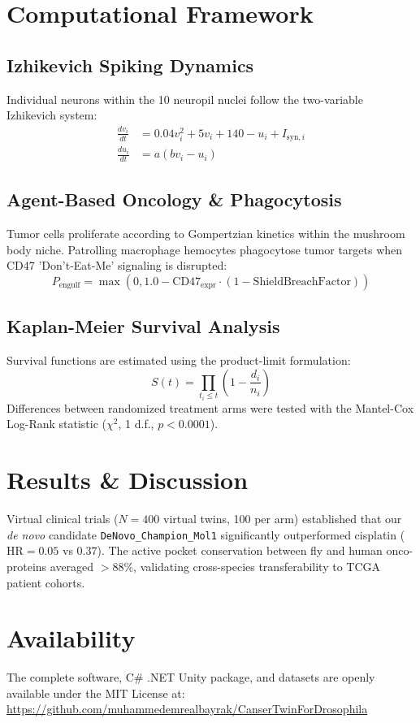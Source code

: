 \documentclass[11pt,a4paper]{article}
\begin{document}
\section{Computational Framework}
\subsection{Izhikevich Spiking Dynamics}
Individual neurons within the 10 neuropil nuclei follow the two-variable Izhikevich system:
\begin{align}
\frac{dv_i}{dt} &= 0.04 v_i^2 + 5 v_i + 140 - u_i + I_{\text{syn}, i} \\
\frac{du_i}{dt} &= a(b v_i - u_i)
\end{align}

\subsection{Agent-Based Oncology \& Phagocytosis}
Tumor cells proliferate according to Gompertzian kinetics within the mushroom body niche. Patrolling macrophage hemocytes phagocytose tumor targets when CD47 'Don't-Eat-Me' signaling is disrupted:
\begin{equation}
P_{\text{engulf}} = \max\left(0, 1.0 - \text{CD47}_{\text{expr}} \cdot (1 - \text{ShieldBreachFactor})\right)
\end{equation}

\subsection{Kaplan-Meier Survival Analysis}
Survival functions are estimated using the product-limit formulation:
\begin{equation}
S(t) = \prod_{t_i \le t} \left(1 - \frac{d_i}{n_i}\right)
\end{equation}
Differences between randomized treatment arms were tested with the Mantel-Cox Log-Rank statistic ($\chi^2$, 1 d.f., $p < 0.0001$).

\section{Results \& Discussion}
Virtual clinical trials ($N=400$ virtual twins, 100 per arm) established that our \textit{de novo} candidate \texttt{DeNovo\_Champion\_Mol1} significantly outperformed cisplatin ($\text{HR} = 0.05$ vs $0.37$). The active pocket conservation between fly and human onco-proteins averaged $>88\%$, validating cross-species transferability to TCGA patient cohorts.

\section{Availability}
The complete software, C\# .NET Unity package, and datasets are openly available under the MIT License at: \\
\url{https://github.com/muhammedemrealbayrak/CanserTwinForDrosophila}



\end{document}
